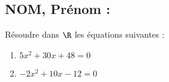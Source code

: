 \documentclass[a4paper,11pt,exos]{nsi} %
\begin{document}


\subsection*{NOM, Prénom : \dotfill} 

\maketitle

\begin{exercice}
    Résoudre dans $\R$ les équations suivantes :
    \begin{multicols}{2}
        \begin{enumerate}
            \item $5x^2+30x+48=0$
	        \item $-2x^2+10x-12=0$
        \end{enumerate}
    \end{multicols}
    
\end{exercice}

\end{document}
